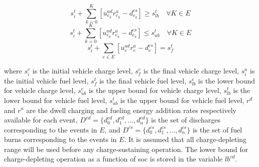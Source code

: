 \documentclass[12pt]{article}
\begin{document}
\begin{equation}
	s_i^t+\sum_{k=0}^{K}[u_{e_k}^{ad}r_{e_k}^{a}-d_{e_k}^{cs}]\geq s_{lb}^t\quad \forall K\in E
\end{equation}
\begin{equation}
	s_i^t+\sum_{k=0}^{K}[u_{e_k}^{ad}r_{e_k}^{a}-d_{e_k}^{cs}]\leq s_{ub}^t\quad \forall K\in E
\end{equation}
\begin{equation}
	s_i^t+\sum_{e\in E}[u_{e}^{ad}r_{e}^{a}-d_{e}^{cs}]=s_f^t
\end{equation}

where $s_i^c$ is the initial vehicle charge level, $s_f^c$ is the final vehicle charge level, $s_i^a$ is the initial vehicle fuel level, $s_f^t$ is the final vehicle fuel level, $s_{lb}^c$ is the lower bound for vehicle charge level, $s_{ub}^c$ is the upper bound for vehicle charge level, $s_{lb}^t$ is the lower bound for vehicle fuel level, $s_{ub}^t$ is the upper bound for vehicle fuel level, $r^d$ and $r^a$ are the dwell charging and fueling energy addition rates respectively available for each event, $D^{cd}=\{d_0^{cd},d_1^{cd},\dots,d_n^{cd}\}$ is the set of discharges corresponding to the events in $E$, and $D^{cs}=\{d_0^{cs},d_1^{cs},\dots,d_n^{cs}\}$ is the set of fuel burns corresponding to the events in $E$. It is assumed that all charge-depleting range will be used before any charge-sustaining operation. The lower bound for charge-depleting operation as a function of \gls{soc} is stored in the variable $lb^{cd}$.
\end{document}
